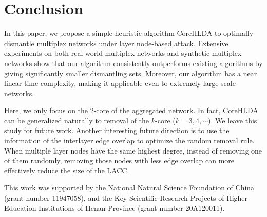 \documentclass[%
 aip,
 cha,
 amsmath,amssymb,
 reprint,%
]{revtex4-1}
\begin{document}
\section{\label{sec5}Conclusion}
In this paper, we propose a simple heuristic algorithm CoreHLDA to optimally dismantle multiplex networks under layer node-based attack. Extensive experiments on both real-world multiplex networks and synthetic multiplex networks show that our algorithm consistently outperforms existing algorithms by giving significantly smaller dismantling sets. Moreover, our algorithm has a near linear time complexity, making it applicable even to extremely large-scale networks.

Here, we only focus on the 2-core of the aggregated network. In fact, CoreHLDA can be generalized naturally to removal of the $k$-core ($k=3,4,\cdots$). We leave this study for future work. Another interesting future direction is to use the information of the interlayer edge overlap to optimize the random removal rule. When multiple layer nodes have the same highest degree, instead of removing one of them randomly, removing those nodes with less edge overlap can more effectively reduce the size of the LACC.

\begin{acknowledgments}
This work was supported by the National Natural Science Foundation of China (grant number 11947058), and the Key Scientific Research Projects of Higher Education Institutions of Henan Province (grant number 20A120011).
\end{acknowledgments}

\end{document}

